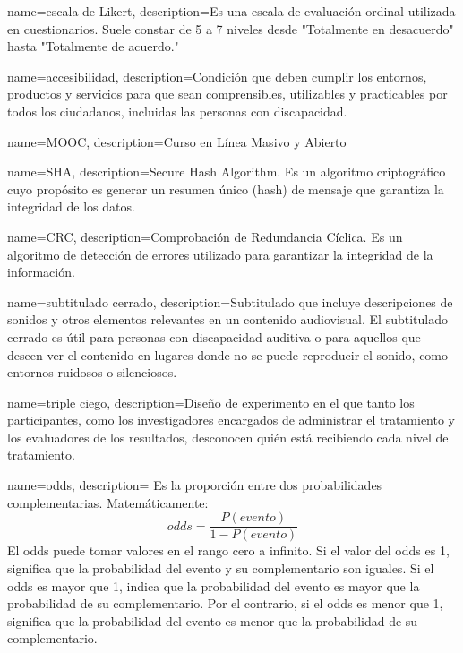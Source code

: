 \cleardoublepage
{}

{
    name=escala de Likert,
    description={Es una escala de evaluación ordinal utilizada en cuestionarios. Suele constar de 5 a 7 niveles desde "Totalmente en desacuerdo" hasta "Totalmente de acuerdo."}
}

{
    name=accesibilidad,
    description={Condición que deben cumplir los entornos, productos y servicios para que sean comprensibles, utilizables y practicables por todos los ciudadanos, incluidas las personas con discapacidad.}
}


{
    name=MOOC,
    description={Curso en Línea Masivo y Abierto}
}


{
    name=SHA,
    description={Secure Hash Algorithm.
    Es un algoritmo criptográfico cuyo propósito es generar un resumen único (hash) de mensaje
    que garantiza la integridad de los datos.
    }
}


{
    name=CRC,
    description={Comprobación de Redundancia Cíclica.
    Es un algoritmo de detección de errores utilizado para garantizar la integridad de la información.
    }
}


{
    name=subtitulado cerrado,
    description={Subtitulado que incluye descripciones de sonidos y otros elementos relevantes en un contenido audiovisual.
    El subtitulado cerrado es útil para personas con discapacidad auditiva o para aquellos que deseen ver
    el contenido en lugares donde no se puede reproducir el sonido, como entornos ruidosos o silenciosos.
    }
}


{
    name=triple ciego,
    description={Diseño de experimento en el que tanto los participantes,
    como los investigadores encargados de administrar el tratamiento y
    los evaluadores de los resultados, desconocen quién está recibiendo cada nivel de tratamiento.}
}


{
    name=odds,
    description={
        Es la proporción entre dos probabilidades complementarias. Matemáticamente:
    $$
        odds = \frac{P(evento)}{1- P(evento)}
    $$
    El odds puede tomar valores en el rango cero a infinito.
    Si el valor del odds es 1, significa que la probabilidad del evento y su complementario son iguales.
    Si el odds es mayor que 1, indica que la probabilidad del evento es mayor que la probabilidad de su complementario.
    Por el contrario, si el odds es menor que 1, significa que la probabilidad del evento es menor que
    la probabilidad de su complementario.}
}

